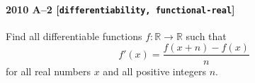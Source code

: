 \paragraph{2010 A--2 \textnormal{[\texttt{differentiability, functional-real}]}}
Find all differentiable functions $f:\mathbb{R} \to \mathbb{R}$ such that
\[
f'(x) = \frac{f(x+n)-f(x)}{n}
\]
for all real numbers $x$ and all positive integers $n$.

